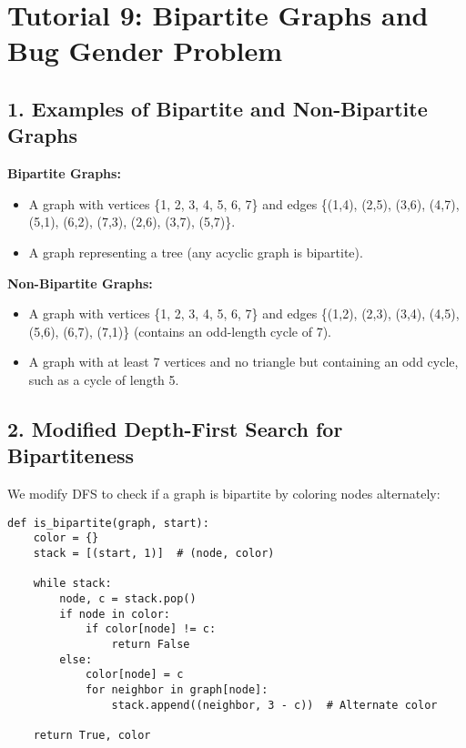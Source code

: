 \documentclass[12pt]{article}
\begin{document}
\renewcommand{\familydefault}{\rmdefault}

\section*{Tutorial 9: Bipartite Graphs and Bug Gender Problem}

\subsection*{1. Examples of Bipartite and Non-Bipartite Graphs}

\textbf{Bipartite Graphs:}
\begin{itemize}
    \item A graph with vertices \{1, 2, 3, 4, 5, 6, 7\} and edges \{(1,4), (2,5), (3,6), (4,7), (5,1), (6,2), (7,3), (2,6), (3,7), (5,7)\}.
    \item A graph representing a tree (any acyclic graph is bipartite).
\end{itemize}

\textbf{Non-Bipartite Graphs:}
\begin{itemize}
    \item A graph with vertices \{1, 2, 3, 4, 5, 6, 7\} and edges \{(1,2), (2,3), (3,4), (4,5), (5,6), (6,7), (7,1)\} (contains an odd-length cycle of 7).
    \item A graph with at least 7 vertices and no triangle but containing an odd cycle, such as a cycle of length 5.
\end{itemize}

\subsection*{2. Modified Depth-First Search for Bipartiteness}

We modify DFS to check if a graph is bipartite by coloring nodes alternately:

\begin{lstlisting}
def is_bipartite(graph, start):
    color = {}
    stack = [(start, 1)]  # (node, color)
    
    while stack:
        node, c = stack.pop()
        if node in color:
            if color[node] != c:
                return False
        else:
            color[node] = c
            for neighbor in graph[node]:
                stack.append((neighbor, 3 - c))  # Alternate color
    
    return True, color
\end{lstlisting}
\end{document}
